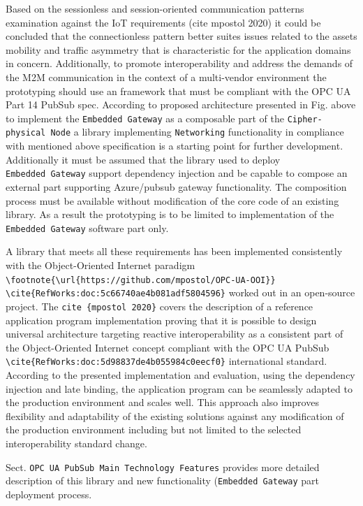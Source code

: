 \documentclass[
]{article}
\begin{document}
Based on the sessionless and session-oriented communication patterns
examination against the IoT requirements (cite mpostol 2020) it could be
concluded that the connectionless pattern better suites issues related
to the assets mobility and traffic asymmetry that is characteristic for
the application domains in concern. Additionally, to promote
interoperability and address the demands of the M2M communication in the
context of a multi-vendor environment the prototyping should use an
framework that must be compliant with the OPC UA Part 14 PubSub spec.
According to proposed architecture presented in Fig. above to implement
the \texttt{Embedded\ Gateway} as a composable part of the
\texttt{Cipher-physical\ Node} a library implementing
\texttt{Networking} functionality in compliance with mentioned above
specification is a starting point for further development. Additionally
it must be assumed that the library used to deploy
\texttt{Embedded\ Gateway} support dependency injection and be capable
to compose an external part supporting Azure/pubsub gateway
functionality. The composition process must be available without
modification of the core code of an existing library. As a result the
prototyping is to be limited to implementation of the
\texttt{Embedded\ Gateway} software part only.

A library that meets all these requirements has been implemented
consistently with the Object-Oriented Internet paradigm
\texttt{\textbackslash{}footnote\{\textbackslash{}url\{https://github.com/mpostol/OPC-UA-OOI\}\}}
\texttt{\textbackslash{}cite\{RefWorks:doc:5c66740ae4b081adf5804596\}}
worked out in an open-source project. The
\texttt{cite\ \{mpostol\ 2020\}} covers the description of a reference
application program implementation proving that it is possible to design
universal architecture targeting reactive interoperability as a
consistent part of the Object-Oriented Internet concept compliant with
the OPC UA PubSub
\texttt{\textbackslash{}cite\{RefWorks:doc:5d98837de4b055984c0eecf0\}}
international standard. According to the presented implementation and
evaluation, using the dependency injection and late binding, the
application program can be seamlessly adapted to the production
environment and scales well. This approach also improves flexibility and
adaptability of the existing solutions against any modification of the
production environment including but not limited to the selected
interoperability standard change.

Sect. \texttt{OPC\ UA\ PubSub\ Main\ Technology\ Features} provides more
detailed description of this library and new functionality
(\texttt{Embedded\ Gateway} part deployment process.
\end{document}
